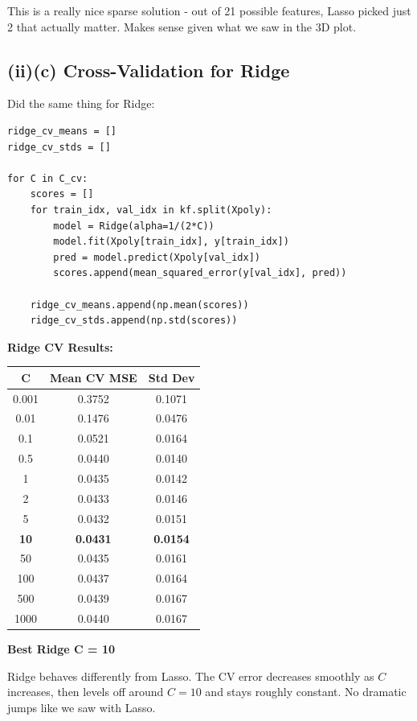 \documentclass[11pt,a4paper]{article}
\begin{document}
This is a really nice sparse solution - out of 21 possible features, Lasso picked just 2 that actually matter. Makes sense given what we saw in the 3D plot.

\subsection*{(ii)(c) Cross-Validation for Ridge}

Did the same thing for Ridge:

\begin{lstlisting}
ridge_cv_means = []
ridge_cv_stds = []

for C in C_cv:
    scores = []
    for train_idx, val_idx in kf.split(Xpoly):
        model = Ridge(alpha=1/(2*C))
        model.fit(Xpoly[train_idx], y[train_idx])
        pred = model.predict(Xpoly[val_idx])
        scores.append(mean_squared_error(y[val_idx], pred))
    
    ridge_cv_means.append(np.mean(scores))
    ridge_cv_stds.append(np.std(scores))
\end{lstlisting}

\textbf{Ridge CV Results:}

\begin{table}[H]
\centering
\begin{tabular}{ccc}
\toprule
C & Mean CV MSE & Std Dev \\
\midrule
0.001 & 0.3752 & 0.1071 \\
0.01 & 0.1476 & 0.0476 \\
0.1 & 0.0521 & 0.0164 \\
0.5 & 0.0440 & 0.0140 \\
1 & 0.0435 & 0.0142 \\
2 & 0.0433 & 0.0146 \\
5 & 0.0432 & 0.0151 \\
\textbf{10} & \textbf{0.0431} & \textbf{0.0154} \\
50 & 0.0435 & 0.0161 \\
100 & 0.0437 & 0.0164 \\
500 & 0.0439 & 0.0167 \\
1000 & 0.0440 & 0.0167 \\
\bottomrule
\end{tabular}
\end{table}

\textbf{Best Ridge C = 10}

Ridge behaves differently from Lasso. The CV error decreases smoothly as $C$ increases, then levels off around $C=10$ and stays roughly constant. No dramatic jumps like we saw with Lasso.
\end{document}
